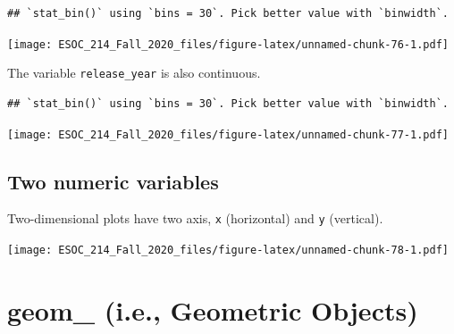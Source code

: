 \documentclass[
]{book}
\newenvironment{Shaded}{\begin{snugshade}}{\end{snugshade}}
\newcommand{\DataTypeTok}[1]{\textcolor[rgb]{0.13,0.29,0.53}{#1}}
\newcommand{\KeywordTok}[1]{\textcolor[rgb]{0.13,0.29,0.53}{\textbf{#1}}}
\newcommand{\NormalTok}[1]{#1}
\newcommand{\OperatorTok}[1]{\textcolor[rgb]{0.81,0.36,0.00}{\textbf{#1}}}
\newcommand{\StringTok}[1]{\textcolor[rgb]{0.31,0.60,0.02}{#1}}
\begin{document}
\begin{verbatim}
## `stat_bin()` using `bins = 30`. Pick better value with `binwidth`.
\end{verbatim}

\texttt{[image: ESOC\_214\_Fall\_2020\_files/figure-latex/unnamed-chunk-76-1.pdf]}

The variable \texttt{release\_year} is also continuous.

\begin{Shaded}
\end{Shaded}

\begin{verbatim}
## `stat_bin()` using `bins = 30`. Pick better value with `binwidth`.
\end{verbatim}

\texttt{[image: ESOC\_214\_Fall\_2020\_files/figure-latex/unnamed-chunk-77-1.pdf]}

\hypertarget{two-numeric-variables}{%
\subsection{Two numeric variables}\label{two-numeric-variables}}

Two-dimensional plots have two axis, \texttt{x} (horizontal) and \texttt{y} (vertical).

\begin{Shaded}
\end{Shaded}

\texttt{[image: ESOC\_214\_Fall\_2020\_files/figure-latex/unnamed-chunk-78-1.pdf]}

\hypertarget{geom_-i.e.-geometric-objects}{%
\section{geom\_ (i.e., Geometric Objects)}\label{geom_-i.e.-geometric-objects}}
\end{document}
